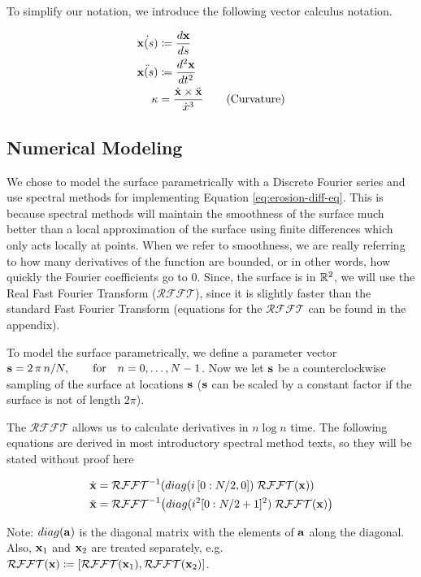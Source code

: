To simplify our notation, we introduce the following vector calculus notation.

\begin{align*}
  \dot{\mathbf{x}(s)}& \coloneqq \frac{d\mathbf{x}}{ds}\\
  \ddot{\mathbf{x}(s)}& \coloneqq \frac{d^2\mathbf{x}}{dt^2}\\
  \kappa& = \frac{\dot{\mathbf{x}} \times \ddot{\mathbf{x}}}{\dot{x}^3} \tag{Curvature}
\end{align*}

\subsection*{Numerical Modeling}\label{sec:numerical-modeling}

We chose to model the surface parametrically with a Discrete Fourier series and use spectral methods for implementing Equation \ref{eq:erosion-diff-eq}. This is because spectral methods will maintain the smoothness of the surface much better than a local approximation of the surface using finite differences which only acts locally at points. When we refer to smoothness, we are really referring to how many derivatives of the function are bounded, or in other words, how quickly the Fourier coefficients go to $0$. Since, the surface is in $\mathbb R^2$, we will use the Real Fast Fourier Transform ($\mathcal{RFFT}$), since it is slightly faster than the standard Fast Fourier Transform (equations for the $\mathcal{RFFT}$ can be found in the appendix). 

To model the surface parametrically, we define a parameter vector $\mathbf{s} = 2 \, \pi \, n / N, \qquad \text{for} \quad n = 0, \dotsc, N-1$. Now we let $\mathbf{s}$ be a counterclockwise sampling of the surface at locations $\mathbf{s}$ ($\mathbf{s}$ can be scaled by a constant factor if the surface is not of length $2\pi$).

The $\mathcal{RFFT}$ allows us to calculate derivatives in $n \log{n}$ time. The following equations are derived in most introductory spectral method texts, so they will be stated without proof here

\begin{align}
  \dot{\bvec{x}}& = \mathcal{RFFT}^{-1}\paren{diag(i \, [0:N/2, 0]) \; \mathcal{RFFT}(\bvec{x})}\\
  \ddot{\bvec{x}}& = \mathcal{RFFT}^{-1}\paren{diag(i^2 [0:N/2+1]^2) \; \mathcal{RFFT}(\bvec{x})}
\end{align}

Note: $diag(\mathbf{a})$ is the diagonal matrix with the elements of $\mathbf{a}$ along the diagonal. Also, $\mathbf{x}_1$ and $\mathbf{x}_2$ are treated separately, e.g.\ $\mathcal{\mathcal{RFFT}}(\mathbf{x}) \coloneqq [\mathcal{RFFT}(\mathbf{x}_1), \mathcal{RFFT}(\mathbf{x}_2)]$.

